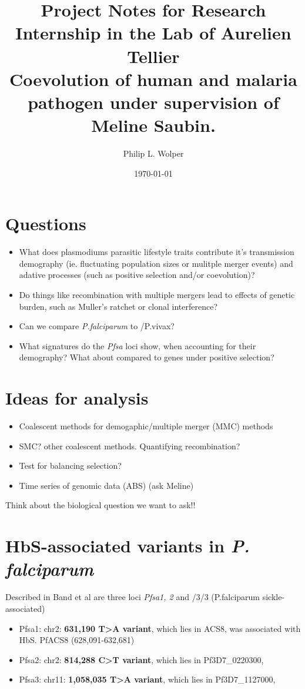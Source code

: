 \documentclass[11pt]{article}
\author{Philip L. Wolper}
\date{\today}
\title{Project Notes for Research Internship in the Lab of Aurelien Tellier\\\medskip
\large Coevolution of human and malaria pathogen under supervision of Meline Saubin.}
\begin{document}
\maketitle


\section{Questions}
\label{sec:org385462e}
\begin{itemize}
\item What does plasmodiums parasitic lifestyle traits contribute it's transmission demography (ie. fluctuating population sizes or mulitple merger events) and adative processes (such as  positive selection and/or coevolution)?
\item Do things like recombination with multiple mergers lead to effects of genetic burden, such as Muller's ratchet or clonal interference?
\item Can we compare \emph{P.falciparum} to /P.vivax?
\item What signatures do the \emph{Pfsa} loci show, when accounting for their demography? What about compared to genes under positive selection?
\end{itemize}

\section{Ideas for analysis}
\label{sec:org9c3313a}
\begin{itemize}
\item Coalescent methods for demogaphic/multiple merger (MMC) methods
\cite{korfmann-2023-simul-infer}
\item SMC? other coalescent methods. Quantifying recombination?
\item Test for balancing selection?
\item Time series of genomic data (ABS) (ask  Meline)
\end{itemize}

Think about the biological question we want to ask!!

\section{HbS-associated variants in \emph{P. falciparum}}
\label{sec:orgfdb52d1}
Described in Band et al are three loci \emph{Pfsa1, 2} and /3/3 (P.falciparum sickle-associated)

\begin{itemize}
\item Pfsa1: chr2: \textbf{631,190 T>A variant}, which lies in ACS8, was associated with HbS. PfACS8 (628,091-632,681)
\item Pfsa2: chr2: \textbf{814,288 C>T variant}, which lies in Pf3D7\_0220300,
\item Pfsa3: chr11: \textbf{1,058,035 T>A variant}, which lies in Pf3D7\_1127000,
\end{itemize}
\end{document}
